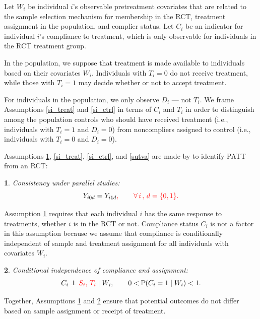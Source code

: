 \documentclass[hidelinks,12pt]{article}
\makeatletter
\newtheorem*{assumption*}{\assumptionnumber}
\providecommand{\assumptionnumber}{}
\newenvironment{assumption}[2]
 {%
  \renewcommand{\assumptionnumber}{Assumption #1}%
  \begin{assumption*}%
  \protected@edef\@currentlabel{#1}%
 }
 {%
  \end{assumption*}
 }
\newcommand{\pr}{\mathbb{P}} %
\newcommand\independent{\protect\mathpalette{\protect\independenT}{\perp}}
\def\independenT#1#2{\mathrel{\rlap{$#1#2$}\mkern2mu{#1#2}}}
\makeatother
\begin{document}
Let $W_i$ be individual $i$'s observable pretreatment covariates that are related to the sample selection mechanism for membership in the RCT, treatment assignment in the population, and complier status. Let $C_i$ be an indicator for individual $i$'s compliance to treatment{\color{red}, which is only observable for individuals in the RCT treatment group}. 

In the population, we suppose that treatment is made available to individuals based on their covariates $W_i$. Individuals with $T_i = 0$ do not receive treatment, while those with $T_i=1$ may decide whether or not to accept treatment. {\color{red}For individuals in the population, we only observe $D_i$ --- not $T_i$. We frame Assumptions \ref{si_treat} and \ref{si_ctrl} in terms of $C_i$ and $T_i$ in order to distinguish among the population controls who should have received treatment (i.e., individuals with $T_i = 1$ and $D_i = 0$) from noncompliers assigned to control (i.e., individuals with $T_i = 0$ and $D_i = 0$). 

Assumptions \ref{consistency}, \ref{si_treat}, \ref{si_ctrl}, and \ref{sutva} are made by \citet{Hartman} to identify PATT from an RCT:
}

\vskip 0.2in
\begin{assumption}{1}{}\label{consistency}
	Consistency under parallel studies:
	\begin{equation*}
	Y_{i0d} = Y_{i1d}{\color{red}, \qquad \forall \, i \, , \, d=\{0,1\}.}
	\end{equation*}
\end{assumption} 

\noindent Assumption \ref{consistency} requires that each individual $i$ has the same response to treatments, whether $i$ is in the RCT or not. {\color{red} Compliance status $C_i$ is not a factor in this assumption because we assume that compliance is conditionally independent of sample and treatment assignment for all individuals with covariates $W_i$.}
	
\vskip 0.2in
\begin{assumption}{2}{}\label{compl}
	Conditional independence of compliance and assignment:
	\begin{equation*}
	C_i \independent {\color{red}S_i,\,T_i} \mid W_i, \qquad 0 < \pr(C_i = 1 \mid W_i) < 1. 
	\end{equation*}
\end{assumption}

 Together, Assumptions \ref{consistency} and \ref{compl} ensure that potential outcomes do not differ based on sample assignment or receipt of treatment.
\end{document}
